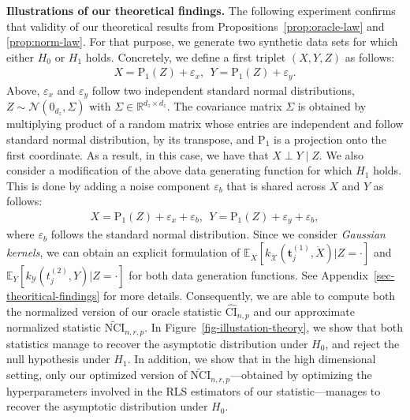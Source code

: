 \textbf{Illustrations of our theoretical findings.} 
The following experiment confirms that validity of our theoretical results from Propositions~\ref{prop:oracle-law} and \ref{prop:norm-law}. For that purpose, we generate two synthetic data sets for which either $H_0$ or $H_1$ holds. Concretely, we define a first triplet $(X,Y,Z)$ as follows:
\begin{align}
\label{exp-illustration-h0}
X = \text{P}_1(Z) + \varepsilon_x,~~Y = \text{P}_1(Z) + \varepsilon_y.
\end{align}
Above, $\varepsilon_x$ and $\varepsilon_y$ follow two independent standard normal distributions, $Z\sim \mathcal{N}(0_{d_z},\Sigma)$ with $\Sigma\in\mathbb{R}^{d_z\times d_z}$. The covariance matrix $\Sigma$  is obtained by multiplying product of a random matrix whose entries are independent and follow standard normal distribution, by its transpose, and $\text{P}_1$ is a projection onto the first coordinate. As a result, in this case, we have that $X\perp Y \mid Z$. We also consider a modification of the above data generating function for which $H_1$ holds. This is done by adding a noise component $\varepsilon_b$ that is shared across $X$ and $Y$ as follows:
\begin{align}
\label{exp-illustration-h1}
X = \text{P}_1(Z) + \varepsilon_x + \varepsilon_b,~~ Y = \text{P}_1(Z) + \varepsilon_y + \varepsilon_b,
\end{align}
where $\varepsilon_b$ follows the standard normal distribution. Since we consider \emph{Gaussian kernels}, we can obtain an explicit formulation of $\mathbb{E}_{\ddot{X}}\left[k_{\mathcal{\ddot{X}}}(\mathbf{t}^{(1)}_j,\ddot{X})|Z=\cdot\right]$ and $\mathbb{E}_{Y}\left[k_{\mathcal{Y}}(t^{(2)}_j,Y)|Z=\cdot\right]$ for both data generation functions. See Appendix~\ref{sec-theoritical-findings} for more details. 
Consequently, we are able to compute both the normalized version of our oracle statistic $\widehat{\text{CI}}_{n,p}$ and our approximate normalized statistic $\widetilde{\text{NCI}}_{n,r,p}$. In Figure~\ref{fig-illustation-theory}, we show that both statistics manage to recover the asymptotic distribution under $H_0$, and reject the null hypothesis under $H_1$. In addition, we show that in the high dimensional setting, only our optimized version of $\widetilde{\text{NCI}}_{n,r,p}$---obtained by optimizing the hyperparameters involved in the RLS estimators of our statistic---manages to recover the asymptotic distribution under $H_0$.





